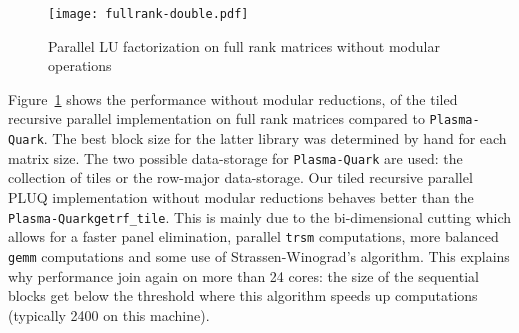 \documentclass{article}
\newcommand{\gemm}{\texttt{gemm}\xspace}
\newcommand{\trsm}{\texttt{trsm}\xspace}
\newcommand{\dgetrftile}{\texttt{getrf\_tile}\xspace}
\newcommand{\plasmaquark}{\texttt{Plasma-Quark}\xspace}
\begin{document}
\begin{figure}[ht!]
\centering
\texttt{[image: fullrank-double.pdf]}
\caption{Parallel LU factorization on full rank matrices without modular operations}
\label{fig:doubleBlockLU}
\end{figure}
Figure~\ref{fig:doubleBlockLU} shows the performance without modular
reductions, of the tiled recursive parallel implementation on full rank matrices
compared to \plasmaquark. 
The best block size for the latter library was
determined by hand for each matrix size. The two possible data-storage for
\plasmaquark are used: the collection of tiles or the row-major data-storage.
Our tiled recursive parallel PLUQ implementation without modular reductions
behaves better than the \plasmaquark \dgetrftile. This is mainly due
to the bi-dimensional cutting which allows for a faster panel elimination,  parallel \trsm
computations, more balanced \gemm computations and some use of
Strassen-Winograd's algorithm. This explains why performance join again on more
than 24 cores: the size of the sequential blocks get below the threshold where
this algorithm speeds up computations (typically 2400 on this machine).
 
 
 
 
 
 
 
 
 
 
 
 
 
 
 
 
 
 
 
 
 
 

 
 
 
 
 
 

 

 
 
 
 
 
 
 
 
 

 


 
 
 
 
 
 
 
 
 
 
 
 
 
 
 
 
 
 
\end{document}
